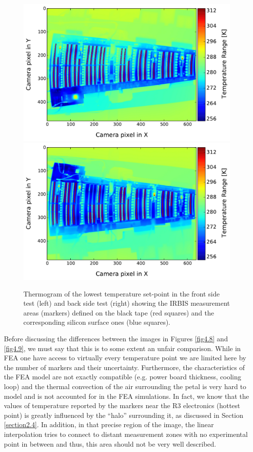 		\begin{figure}[ht!]
			\centering
			\captionsetup{justification=centering,margin=2cm}
			\includegraphics[scale=0.39]{Figures/Chapter04/thermo_Temp_20170803154926.pdf}
			\includegraphics[scale=0.39]{Figures/Chapter04/thermo_Temp_201708101118_avg.pdf}
			\caption{Thermogram of the lowest temperature set-point in the front side test (left) and back side test (right) showing the IRBIS measurement areas (markers) defined on the black tape (red squares) and the corresponding silicon surface ones (blue squares).}\label{fig4.7}
		\end{figure}
		
		Before discussing the differences between the images in Figures \ref{fig4.8} and \ref{fig4.9}, we must say that this is to some extent an unfair comparison. While in FEA one have access to virtually every temperature point we are limited here by the number of markers and their uncertainty. Furthermore, the characteristics of the FEA model are not exactly compatible (e.g. power board thickness, cooling loop) and the thermal convection of the air surrounding the petal is very hard to model and is not accounted for in the FEA simulations. In fact, we know that the values of temperature reported by the markers near the R3 electronics (hottest point) is greatly influenced by the “halo” surrounding it, as discussed in Section \ref{section2.4}. In addition, in that precise region of the image, the linear interpolation tries to connect to distant measurement zones with no experimental point in between and thus, this area should not be very well described.
		
